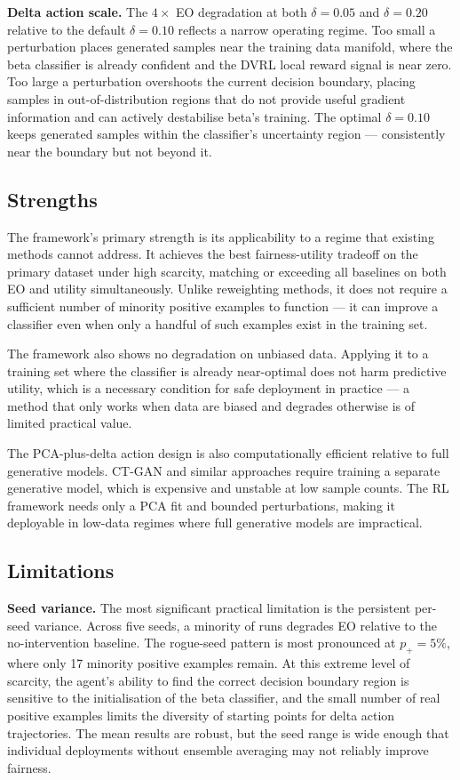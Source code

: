 \textbf{Delta action scale.}
The $4\times$ EO degradation at both $\delta = 0.05$ and $\delta = 0.20$
relative to the default $\delta = 0.10$ reflects a narrow operating regime.
Too small a perturbation places generated samples near the training data
manifold, where the beta classifier is already confident and the DVRL local
reward signal is near zero.
Too large a perturbation overshoots the current decision boundary, placing
samples in out-of-distribution regions that do not provide useful gradient
information and can actively destabilise beta's training.
The optimal $\delta = 0.10$ keeps generated samples within the classifier's
uncertainty region — consistently near the boundary but not beyond it.

\subsection{Strengths}

The framework's primary strength is its applicability to a regime that existing
methods cannot address.
It achieves the best fairness-utility tradeoff on the primary dataset under
high scarcity, matching or exceeding all baselines on both EO and utility
simultaneously.
Unlike reweighting methods, it does not require a sufficient number of
minority positive examples to function — it can improve a classifier even when
only a handful of such examples exist in the training set.

The framework also shows no degradation on unbiased data.
Applying it to a training set where the classifier is already near-optimal does
not harm predictive utility, which is a necessary condition for safe deployment
in practice — a method that only works when data are biased and degrades
otherwise is of limited practical value.

The PCA-plus-delta action design is also computationally efficient relative to
full generative models.
CT-GAN and similar approaches require training a separate generative model,
which is expensive and unstable at low sample counts.
The RL framework needs only a PCA fit and bounded perturbations, making it
deployable in low-data regimes where full generative models are impractical.

\subsection{Limitations}

\textbf{Seed variance.}
The most significant practical limitation is the persistent per-seed variance.
Across five seeds, a minority of runs degrades EO relative to the no-intervention
baseline.
The rogue-seed pattern is most pronounced at $p_+ = 5\%$, where only 17
minority positive examples remain.
At this extreme level of scarcity, the agent's ability to find the correct
decision boundary region is sensitive to the initialisation of the beta
classifier, and the small number of real positive examples limits the diversity
of starting points for delta action trajectories.
The mean results are robust, but the seed range is wide enough that individual
deployments without ensemble averaging may not reliably improve fairness.

